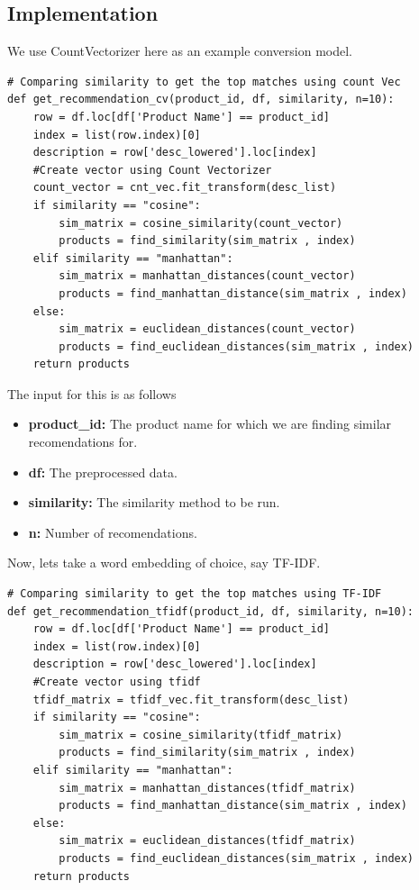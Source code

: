 \documentclass{article}
\begin{document}
\subsection{Implementation}

We use CountVectorizer here as an example conversion model.

\begin{lstlisting}
# Comparing similarity to get the top matches using count Vec
def get_recommendation_cv(product_id, df, similarity, n=10):
    row = df.loc[df['Product Name'] == product_id]
    index = list(row.index)[0]
    description = row['desc_lowered'].loc[index]
    #Create vector using Count Vectorizer
    count_vector = cnt_vec.fit_transform(desc_list)
    if similarity == "cosine":
        sim_matrix = cosine_similarity(count_vector)
        products = find_similarity(sim_matrix , index)
    elif similarity == "manhattan":
        sim_matrix = manhattan_distances(count_vector)
        products = find_manhattan_distance(sim_matrix , index)
    else:
        sim_matrix = euclidean_distances(count_vector)
        products = find_euclidean_distances(sim_matrix , index)
    return products
\end{lstlisting}

The input for this is as follows

\begin{itemize}
    \item{\textbf{product\_id:} The product name for which we are finding similar recomendations for.}
    \item{\textbf{df:} The preprocessed data.}
    \item{\textbf{similarity:} The similarity method to be run.}
    \item{\textbf{n:} Number of recomendations.}
\end{itemize}

Now, lets take a word embedding of choice, say TF-IDF.

\begin{lstlisting}
# Comparing similarity to get the top matches using TF-IDF
def get_recommendation_tfidf(product_id, df, similarity, n=10):
    row = df.loc[df['Product Name'] == product_id]
    index = list(row.index)[0]
    description = row['desc_lowered'].loc[index]
    #Create vector using tfidf
    tfidf_matrix = tfidf_vec.fit_transform(desc_list)
    if similarity == "cosine":
        sim_matrix = cosine_similarity(tfidf_matrix)
        products = find_similarity(sim_matrix , index)
    elif similarity == "manhattan":
        sim_matrix = manhattan_distances(tfidf_matrix)
        products = find_manhattan_distance(sim_matrix , index)
    else:
        sim_matrix = euclidean_distances(tfidf_matrix)
        products = find_euclidean_distances(sim_matrix , index)
    return products
\end{lstlisting}
\end{document}
